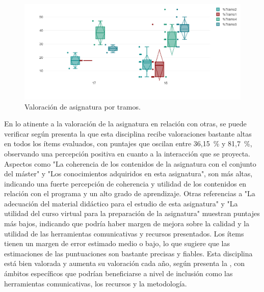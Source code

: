 \begin{figure}[htbp]
\centering
\begin{minipage}{.85\textwidth}
\caption{Valoración de asignatura por tramos.}
\label{fig-04}
\includegraphics[width=\textwidth]{Imagem4.png}
\end{minipage}
\end{figure}
	
En lo atinente a la valoración de la asignatura en relación con otras,
se puede verificar según presenta la  que esta disciplina recibe
valoraciones bastante altas en todos los ítems evaluados, con puntajes
que oscilan entre 36,15~\% y 81,7~\%, observando una percepción positiva
en cuanto a la interacción que se proyecta. Aspectos como "La coherencia
de los contenidos de la asignatura con el conjunto del máster" y "Los
conocimientos adquiridos en esta asignatura", son más altas, indicando
una fuerte percepción de coherencia y utilidad de los contenidos en
relación con el programa y un alto grado de aprendizaje. Otras
referencias a "La adecuación del material didáctico para el estudio de
esta asignatura" y "La utilidad del curso virtual para la preparación de
la asignatura" muestran puntajes más bajos, indicando que podría haber
margen de mejora sobre la calidad y la utilidad de las herramientas
comunicativas y recursos presentados. Los ítems tienen un margen de
error estimado medio o bajo, lo que sugiere que las estimaciones de las
puntuaciones son bastante precisas y fiables. Esta disciplina está bien
valorada y aumenta su valoración cada año, según presenta la ,
con ámbitos específicos que podrían beneficiarse a nivel de inclusión
como las herramientas comunicativas, los recursos y la metodología.
	

